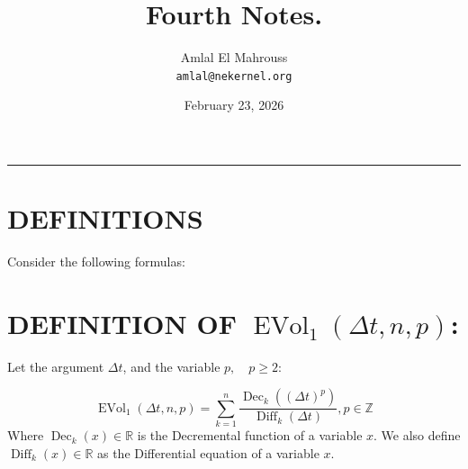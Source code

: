 \documentclass[11pt, a4paper]{article}
\title{Fourth Notes.}
\author{Amlal El Mahrouss\\\texttt{amlal@nekernel.org}}
\date{February 23, 2026}
\begin{document}
\maketitle

\begin{center}
	\rule[0.01cm]{17cm}{0.01cm}
\end{center}

\section{DEFINITIONS}

Consider the following formulas:

\section{DEFINITION OF $\operatorname{EVol}_{1}(\Delta t, n, p)$:}

Let the argument $\Delta t$, and the variable $p, \quad p \geq 2$:

\begin{equation}
    \operatorname{EVol}_{1}(\Delta t, n, p) = \sum_{k=1}^{n} \frac{\operatorname{Dec}_{k}((\Delta t)^{p})}{\operatorname{Diff}_{k}(\Delta t)}, p \in \mathbb{Z}
\end{equation}
Where $\operatorname{Dec}_{k}(x) \in \mathbb{R}$ is the Decremental function of a variable $x$. We also define $\operatorname{Diff}_{k}(x) \in \mathbb{R}$ as the Differential equation of a variable $x$.
\end{document}
